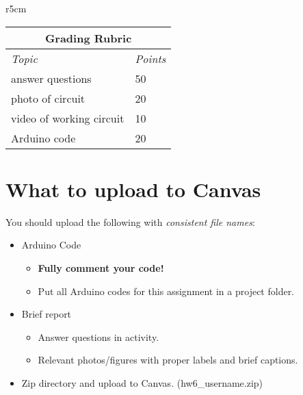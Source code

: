 \documentclass[10pt]{article}
\begin{document}
\begin{wraptable}{r}{5cm}
	\footnotesize
	\centering
	\begin{tabular}{@{}ll@{}}
		\multicolumn{2}{c}{\textbf{Grading Rubric}} \\ \midrule 
		\multicolumn{1}{l}{\textit{Topic}}   & \textit{Points}   \\ \midrule 
		answer questions  & 50   \\ \midrule
		photo of circuit   & 20   \\ \midrule
		video of working circuit & 10  \\ \midrule
		Arduino code & 20 \\ \bottomrule
	\end{tabular}
\end{wraptable}

\section*{What to upload to Canvas}
You should upload the following with \textit{consistent file names}:

\begin{itemize}
	\item Arduino Code
	\begin{itemize}
		\item \textbf{Fully comment your code!} 
		\item Put all Arduino codes for this assignment in a project folder. 
	\end{itemize}
	\item Brief report
	\begin{itemize}
		\item Answer questions in activity.
		\item Relevant photos/figures with proper labels and brief captions.
	\end{itemize}
	\item Zip directory and upload to Canvas. (hw6\_username.zip)
\end{itemize}
\end{document}
